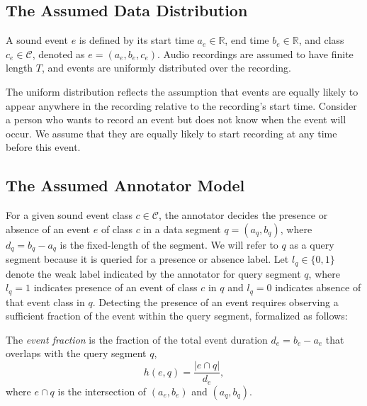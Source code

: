 \subsection{The Assumed Data Distribution}
\label{sec:label_distribution}

A sound event $e$ is defined by its start time \( a_e \in \mathbb{R} \), end time \( b_e \in \mathbb{R} \), and class \( c_e \in \mathcal{C} \), denoted as \( e = (a_e, b_e, c_e) \). Audio recordings are assumed to have finite length \( T \), and events are uniformly distributed over the recording. 


The uniform distribution reflects the assumption that events are equally likely to appear anywhere in the recording relative to the recording's start time. Consider a person who wants to record an event but does not know when the event will occur. We assume that they are equally likely to start recording at any time before this event.

\subsection{The Assumed Annotator Model}
\label{sec:annotator_model}

For a given sound event class \( c \in \mathcal{C} \), the annotator decides the presence or absence of an event $e$ of class \( c \) in a data segment \( q = (a_q, b_q) \), where \( d_q = b_q - a_q \) is the fixed-length of the segment. We will refer to $q$ as a query segment because it is queried for a presence or absence label. Let $l_q \in \{0, 1\}$ denote the weak label indicated by the annotator for query segment $q$, where $l_q = 1$ indicates presence of an event of class $c$ in $q$ and $l_q = 0$ indicates absence of that event class in $q$. Detecting the presence of an event requires observing a sufficient fraction of the event within the query segment, formalized as follows:

\begin{definition}
\label{def:event_fraction}
The \textit{event fraction} is the fraction of the total event duration \( d_e = b_e - a_e \) that overlaps with the query segment \( q \),
\begin{equation}
\label{eq:event_fraction}
    h(e, q) = \frac{|e \cap q|}{d_e},
\end{equation}
where \( e \cap q \) is the intersection of \( (a_e, b_e) \) and \( (a_q, b_q) \).
\end{definition}

